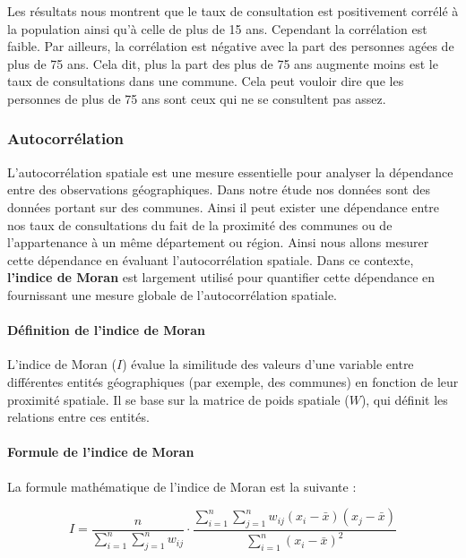 \documentclass[
]{article}
\begin{document}
Les résultats nous montrent que le taux de consultation est positivement
corrélé à la population ainsi qu'à celle de plus de 15 ans. Cependant la
corrélation est faible. Par ailleurs, la corrélation est négative avec
la part des personnes agées de plus de 75 ans. Cela dit, plus la part
des plus de 75 ans augmente moins est le taux de consultations dans une
commune. Cela peut vouloir dire que les personnes de plus de 75 ans sont
ceux qui ne se consultent pas assez.

\subsubsection{Autocorrélation}\label{autocorruxe9lation}

L'autocorrélation spatiale est une mesure essentielle pour analyser la
dépendance entre des observations géographiques. Dans notre étude nos
données sont des données portant sur des communes. Ainsi il peut exister
une dépendance entre nos taux de consultations du fait de la proximité
des communes ou de l'appartenance à un même département ou région. Ainsi
nous allons mesurer cette dépendance en évaluant l'autocorrélation
spatiale. Dans ce contexte, \textbf{l'indice de Moran} est largement
utilisé pour quantifier cette dépendance en fournissant une mesure
globale de l'autocorrélation spatiale.

\paragraph{Définition de l'indice de
Moran}\label{duxe9finition-de-lindice-de-moran}

L'indice de Moran (\(I\)) évalue la similitude des valeurs d'une
variable entre différentes entités géographiques (par exemple, des
communes) en fonction de leur proximité spatiale. Il se base sur la
matrice de poids spatiale (\(W\)), qui définit les relations entre ces
entités.

\paragraph{Formule de l'indice de
Moran}\label{formule-de-lindice-de-moran}

La formule mathématique de l'indice de Moran est la suivante :

\[
I = \frac{n}{\sum_{i=1}^n \sum_{j=1}^n w_{ij}} \cdot \frac{\sum_{i=1}^n \sum_{j=1}^n w_{ij} (x_i - \bar{x})(x_j - \bar{x})}{\sum_{i=1}^n (x_i - \bar{x})^2}
\]
\end{document}
